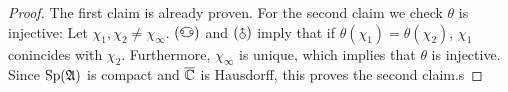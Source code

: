 \documentclass[a4paper,10pt]{article}
\begin{document}
\begin{proof}
The first claim is already proven. For the second claim we check $\theta$ is injective:
Let $\chi_1 , \chi_2 \neq \chi_\infty$. $(\blankone)$ and $(\blanktwo)$ imply that if $\theta (\chi_1)= \theta( \chi_2)$, $\chi_1$ conincides with $\chi_2$. Furthermore, $\chi_\infty$ is unique, which implies that $\theta$ is injective. Since $\operatorname{Sp} (\mathfrak{A})$ is compact and $\overline{\mathbb{C}}$ is Hausdorff,  this proves the second claim.s
\end{proof}


  

 
\end{document}

